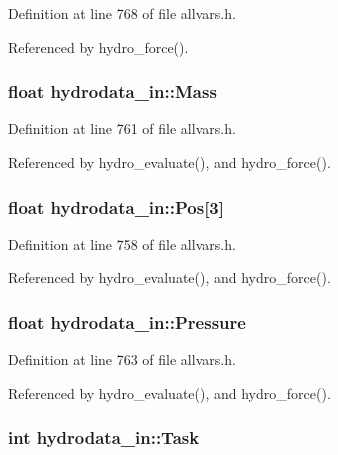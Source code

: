 Definition at line 768 of file allvars.h.



Referenced by hydro\_\-force().

\hypertarget{structhydrodata__in_a5fb05f5111cc5541a5f2d9ad647b0665}{
\subsubsection[{Mass}]{\setlength{\rightskip}{0pt plus 5cm}float {\bf hydrodata\_\-in::Mass}}}
\label{structhydrodata__in_a5fb05f5111cc5541a5f2d9ad647b0665}


Definition at line 761 of file allvars.h.



Referenced by hydro\_\-evaluate(), and hydro\_\-force().

\hypertarget{structhydrodata__in_af50edb8226de4bdcdbcc0f2679cc694d}{
\subsubsection[{Pos}]{\setlength{\rightskip}{0pt plus 5cm}float {\bf hydrodata\_\-in::Pos}\mbox{[}3\mbox{]}}}
\label{structhydrodata__in_af50edb8226de4bdcdbcc0f2679cc694d}


Definition at line 758 of file allvars.h.



Referenced by hydro\_\-evaluate(), and hydro\_\-force().

\hypertarget{structhydrodata__in_a95298759ae954d623a92d59f71d318ba}{
\subsubsection[{Pressure}]{\setlength{\rightskip}{0pt plus 5cm}float {\bf hydrodata\_\-in::Pressure}}}
\label{structhydrodata__in_a95298759ae954d623a92d59f71d318ba}


Definition at line 763 of file allvars.h.



Referenced by hydro\_\-evaluate(), and hydro\_\-force().

\hypertarget{structhydrodata__in_a7d38ae5b3289a90c4d33add0572942cc}{
\subsubsection[{Task}]{\setlength{\rightskip}{0pt plus 5cm}int {\bf hydrodata\_\-in::Task}}}
\label{structhydrodata__in_a7d38ae5b3289a90c4d33add0572942cc}



